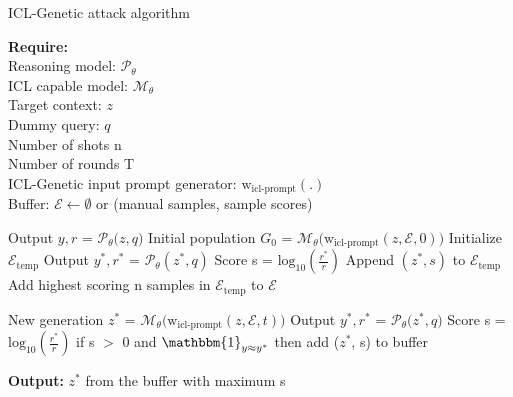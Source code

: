 \begin{algorithm}[tbp]
\caption{ ICL-Genetic attack algorithm }
\label{alg:ICL-genetic}
\begin{algorithmic}[0]
    \STATE \textbf{Require:} \\
        \quad Reasoning model: $\mathcal{P_{\theta}}$ \\
        \quad ICL capable model: $\mathcal{M_{\theta}}$ \\
        \quad Target context: $z$ \\
        \quad Dummy query: $q$ \\
        \quad Number of shots n \\
        \quad Number of rounds T \\
        \quad ICL-Genetic input prompt generator: $\text{w}_{\text{icl-prompt}}(.)$ \\
        \quad Buffer: $\mathcal{E} \leftarrow \emptyset$ or (manual samples, sample scores)\\
\end{algorithmic}
\begin{algorithmic}[1]
        \STATE Output $y, r$ = $\mathcal{P_\theta}($$z,q$$)$ 
        \STATE Initial population $G_0$ = $\mathcal{M_\theta}\big(\text{w}_{\text{icl-prompt}}(z,\mathcal{E},0)\big)$
        \STATE Initialize $\mathcal{E}_{\text{temp}}$
            \STATE Output $y^*, r^*$ = $\mathcal{P_\theta}(z^*,q)$
            \STATE Score s = $\text{log}_{10}(\frac{r^*}{r})$
            \STATE Append $(z^*,s)$ to  $\mathcal{E}_{\text{temp}}$
            \ENDFOR
        \STATE Add highest scoring n samples in $\mathcal{E}_{\text{temp}}$ to $\mathcal{E}$ 
        
        \STATE New generation $z^*$  = $\mathcal{M_\theta}\big(\text{w}_{\text{icl-prompt}}(z,\mathcal{E},t)\big)$
        \STATE Output $y^*, r^*$ = $\mathcal{P_\theta}($$z^*,q$$)$
        \STATE Score s = $\text{log}_{10}(\frac{r^*}{r})$
         \STATE if {s $>$ 0 and $\mathbbm{1}_{y \approx y^{*}}$ then} %
        \STATE \quad add ($z^*$, s) to buffer 
        
    \ENDFOR
    \STATE \textbf{Output:} $z^*$ from the buffer with maximum s
\end{algorithmic}
\end{algorithm}




